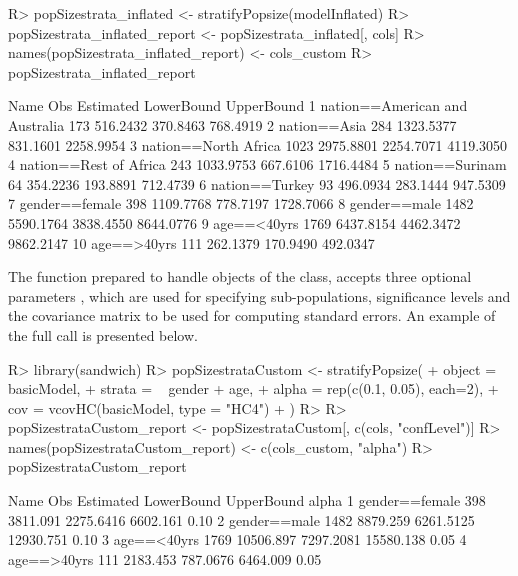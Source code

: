 \documentclass[
]{jss}
\newcommand{\1}{\mathcal{I}} \newcommand{\bZero}{\boldsymbol{0}}
\begin{document}
\begin{CodeChunk}
\begin{CodeInput}
R> popSizestrata_inflated <- stratifyPopsize(modelInflated)
R> popSizestrata_inflated_report <- popSizestrata_inflated[, cols]
R> names(popSizestrata_inflated_report) <- cols_custom
R> popSizestrata_inflated_report
\end{CodeInput}
\begin{CodeOutput}
                             Name  Obs Estimated LowerBound UpperBound
1  nation==American and Australia  173  516.2432   370.8463   768.4919
2                    nation==Asia  284 1323.5377   831.1601  2258.9954
3            nation==North Africa 1023 2975.8801  2254.7071  4119.3050
4          nation==Rest of Africa  243 1033.9753   667.6106  1716.4484
5                 nation==Surinam   64  354.2236   193.8891   712.4739
6                  nation==Turkey   93  496.0934   283.1444   947.5309
7                  gender==female  398 1109.7768   778.7197  1728.7066
8                    gender==male 1482 5590.1764  3838.4550  8644.0776
9                     age==<40yrs 1769 6437.8154  4462.3472  9862.2147
10                    age==>40yrs  111  262.1379   170.9490   492.0347
\end{CodeOutput}
\end{CodeChunk}

The  function prepared to handle objects of the
 class, accepts three optional parameters
, which are used for specifying
sub-populations, significance levels and the covariance matrix to be
used for computing standard errors. An example of the full call is
presented below.

\begin{CodeChunk}
\begin{CodeInput}
R> library(sandwich)
R> popSizestrataCustom <- stratifyPopsize(
+   object  = basicModel,
+   strata = ~ gender + age, 
+   alpha   = rep(c(0.1, 0.05), each=2), 
+   cov     = vcovHC(basicModel, type = "HC4")
+ )
R> 
R> popSizestrataCustom_report <- popSizestrataCustom[, c(cols, "confLevel")]
R> names(popSizestrataCustom_report) <- c(cols_custom, "alpha")
R> popSizestrataCustom_report
\end{CodeInput}
\begin{CodeOutput}
            Name  Obs Estimated LowerBound UpperBound alpha
1 gender==female  398  3811.091  2275.6416   6602.161  0.10
2   gender==male 1482  8879.259  6261.5125  12930.751  0.10
3    age==<40yrs 1769 10506.897  7297.2081  15580.138  0.05
4    age==>40yrs  111  2183.453   787.0676   6464.009  0.05
\end{CodeOutput}
\end{CodeChunk}
\end{document}
